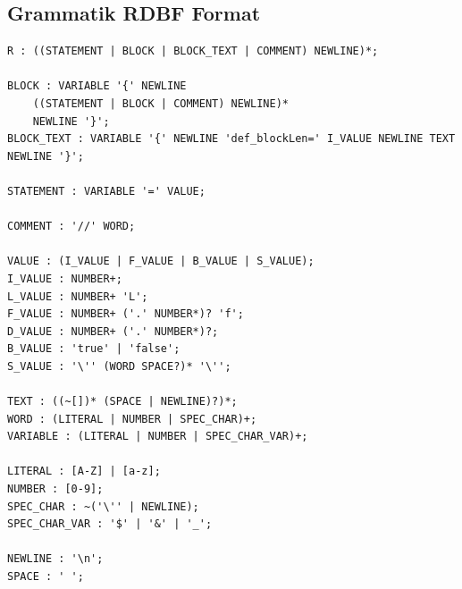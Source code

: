 \documentclass[parskip=full]{scrartcl}
\begin{document}
\subsection{Grammatik RDBF Format}
\begin{verbatim}
R : ((STATEMENT | BLOCK | BLOCK_TEXT | COMMENT) NEWLINE)*;

BLOCK : VARIABLE '{' NEWLINE
	((STATEMENT | BLOCK | COMMENT) NEWLINE)*
	NEWLINE '}';
BLOCK_TEXT : VARIABLE '{' NEWLINE 'def_blockLen=' I_VALUE NEWLINE TEXT NEWLINE '}';
	
STATEMENT : VARIABLE '=' VALUE;

COMMENT : '//' WORD;

VALUE : (I_VALUE | F_VALUE | B_VALUE | S_VALUE);
I_VALUE : NUMBER+;
L_VALUE : NUMBER+ 'L';
F_VALUE : NUMBER+ ('.' NUMBER*)? 'f';
D_VALUE : NUMBER+ ('.' NUMBER*)?;
B_VALUE : 'true' | 'false';
S_VALUE : '\'' (WORD SPACE?)* '\'';

TEXT : ((~[])* (SPACE | NEWLINE)?)*;
WORD : (LITERAL | NUMBER | SPEC_CHAR)+;
VARIABLE : (LITERAL | NUMBER | SPEC_CHAR_VAR)+;

LITERAL : [A-Z] | [a-z];
NUMBER : [0-9];
SPEC_CHAR : ~('\'' | NEWLINE);
SPEC_CHAR_VAR : '$' | '&' | '_';

NEWLINE : '\n';
SPACE : ' ';
\end{verbatim}
\end{document}
